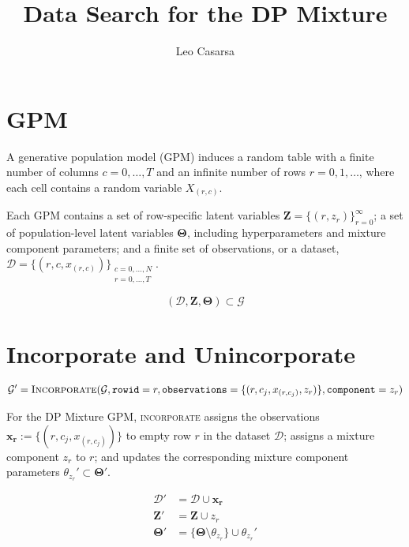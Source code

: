 \documentclass{article}
\newcommand{\Z}{\bm{Z}}
\newcommand{\mD}{\mathcal{D}}
\newcommand{\mG}{\mathcal{G}}
\newcommand{\set}[1]{\{{#1}\}}
\begin{document}
\title{Data Search for the DP Mixture}
\author{Leo Casarsa}
\maketitle 
\section{GPM}

A generative population model (GPM) induces a random table with a finite number of columns $c=0,\ldots,T$ and an infinite number of rows $r=0, 1, \ldots$, where each cell contains a random variable $X_{(r,c)}$. 

Each GPM contains a set of row-specific latent variables $\Z = \set{(r, z_{r})}_{r=0}^\infty$; a set of population-level latent variables $\bm{\Theta}$, including hyperparameters and mixture component parameters; and a finite set of observations, or a dataset, $\mD = \set{(r, c, x_{(r,c)})}_{\substack{c=0, \ldots, N \\ r=0, \ldots, T}}$.

\begin{equation*}
  (\mD, \Z, \bm{\Theta}) \subset \mG
\end{equation*}
 
\section{Incorporate and Unincorporate}

\begin{equation*}
  \mG' = \textsc{Incorporate}(\mG, \texttt{rowid}=r, \texttt{observations}=\set{(r, c_j, x_{(r, c_j)}, z_r)}, \texttt{component}=z_r)
\end{equation*}

For the DP Mixture GPM, \textsc{incorporate} assigns the observations
$\bm{x_r} := \set{(r, c_j, x_{(r, c_j)})}$ to empty row $r$ in the dataset $\mD$; 
assigns a mixture component $z_r$ to $r$; and updates the corresponding
mixture component parameters $\theta_{z_r}' \subset \bm{\Theta}'$.

\begin{align*}
  \mD' &= \mD \cup \bm{x_r}\\
  \Z' &= \Z \cup z_r \\ 
  \bm{\Theta}' &= \set{\bm{\Theta} \setminus \theta_{z_r}} \cup \theta_{z_r}'
\end{align*}
\end{document}
